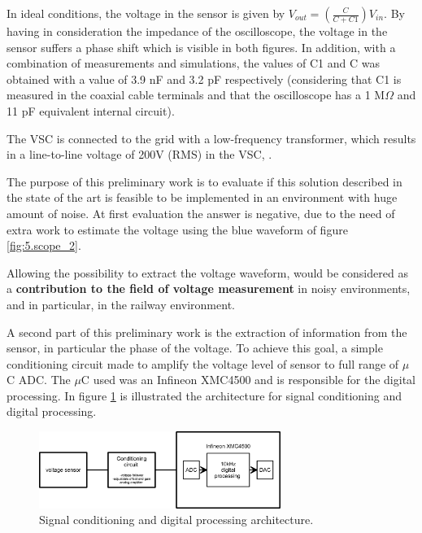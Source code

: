	In ideal conditions, the voltage in the sensor is given by $V_{out} = (\frac{C}{C+C1})  V_{in} $.
	By having in consideration the impedance of the oscilloscope, the voltage in the sensor suffers a phase shift which is visible in both figures.
	In addition, with a combination of measurements and simulations, the values of C1 and C was obtained with a value of 3.9 nF and 3.2 pF respectively (considering that C1 is measured in the coaxial cable terminals and that the oscilloscope has a 1 M$\Omega$ and 11 pF equivalent internal circuit). 
	
	The \ac{VSC} is connected to the grid with a low-frequency transformer, which results in a line-to-line voltage of 200V (RMS) in the \ac{VSC}, \cite{martins2016}.

	The purpose of this preliminary work is to evaluate if this solution described in the state of the art is feasible to be implemented in an environment with huge amount of noise. At first evaluation the answer is negative, due to the need of extra work to estimate the voltage using the blue waveform of figure \ref{fig:5.scope_2}.
	
	
	Allowing the possibility to extract the voltage waveform, would be considered as a \textbf{contribution to the field of voltage measurement} in noisy environments, and in particular, in the railway environment.

	A second part of this preliminary work is the extraction of information from the sensor, in particular the phase of the voltage. To achieve this goal, a simple conditioning circuit made to amplify the voltage level of sensor to full range of $\mu$C ADC. The $\mu$C used was an Infineon XMC4500 and is responsible for the digital processing. In figure \ref{fig:5.generalArchitecture} is illustrated the architecture for signal conditioning and digital processing.
	
	\begin{figure}[h!]
		\centering
		\includegraphics[width=0.7\textwidth,keepaspectratio]{figures/50.PreliminaryW/generalArchitecture}
		\caption{Signal conditioning and digital processing architecture.}
		\label{fig:5.generalArchitecture}
	\end{figure}

